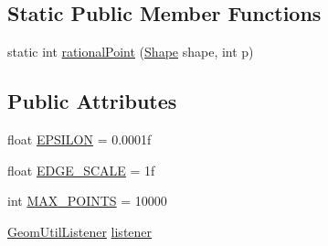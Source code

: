 \subsection*{Static Public Member Functions}
\begin{DoxyCompactItemize}
\item 
static int \mbox{\hyperlink{classorg_1_1newdawn_1_1slick_1_1geom_1_1_geom_util_a6873a13095272143ffefcd31950b12fe}{rational\+Point}} (\mbox{\hyperlink{classorg_1_1newdawn_1_1slick_1_1geom_1_1_shape}{Shape}} shape, int p)
\end{DoxyCompactItemize}
\subsection*{Public Attributes}
\begin{DoxyCompactItemize}
\item 
float \mbox{\hyperlink{classorg_1_1newdawn_1_1slick_1_1geom_1_1_geom_util_a1dc7c8cb05b3d5bc684aced8dfe63a80}{E\+P\+S\+I\+L\+ON}} = 0.\+0001f
\item 
float \mbox{\hyperlink{classorg_1_1newdawn_1_1slick_1_1geom_1_1_geom_util_a249ee70d4c9395cdad063bb34a796864}{E\+D\+G\+E\+\_\+\+S\+C\+A\+LE}} = 1f
\item 
int \mbox{\hyperlink{classorg_1_1newdawn_1_1slick_1_1geom_1_1_geom_util_a141d7821e873feebdb5aa25abd8914b9}{M\+A\+X\+\_\+\+P\+O\+I\+N\+TS}} = 10000
\item 
\mbox{\hyperlink{interfaceorg_1_1newdawn_1_1slick_1_1geom_1_1_geom_util_listener}{Geom\+Util\+Listener}} \mbox{\hyperlink{classorg_1_1newdawn_1_1slick_1_1geom_1_1_geom_util_a322b4fbea4e3b04b040c81c1322809bb}{listener}}
\end{DoxyCompactItemize}
